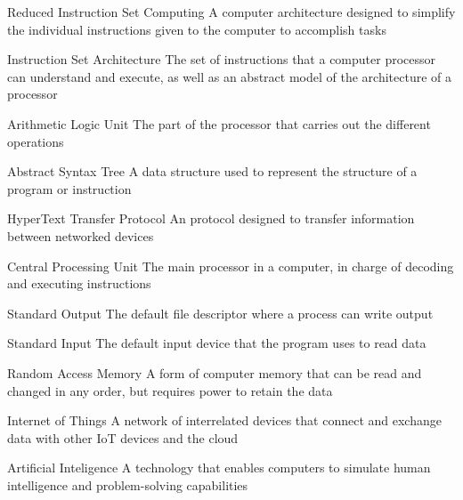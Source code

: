 {Reduced Instruction Set Computing}
{A computer architecture designed to simplify the individual instructions given to the computer to accomplish tasks}

{Instruction Set Architecture}
{The set of instructions that a computer processor can understand and execute, as well as an abstract model of the architecture of a processor}

{Arithmetic Logic Unit}
{The part of the processor that carries out the different operations}

{Abstract Syntax Tree}
{A data structure used to represent the structure of a program or instruction}

{HyperText Transfer Protocol}
{An protocol designed to transfer information between networked devices}

{Central Processing Unit}
{The main processor in a computer, in charge of decoding and executing instructions}

{Standard Output}
{The default file descriptor where a process can write output}

{Standard Input}
{The default input device that the program uses to read data}

{Random Access Memory}
{A form of computer memory that can be read and changed in any order, but requires power to retain the data}

{Internet of Things}
{A network of interrelated devices that connect and exchange data with other IoT devices and the cloud}

{Artificial Inteligence}
{A technology that enables computers to simulate human intelligence and problem-solving capabilities}




